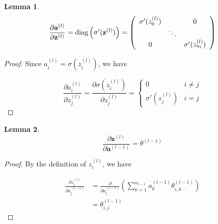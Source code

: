 \documentclass{article}[11pt]
\newtheorem{lemma}{Lemma}
\begin{document}
        
        \begin{lemma}
            
            $$
            \frac{\partial \mathbf{a}^{(l)}}{\partial \mathbf{z}^{(l)}} = \textnormal{diag} \left( \sigma'(\mathbf{z}^{(l)}) \right) = \left( \begin{array}{ccc}
            \sigma'(z^{(l)}_0) & & 0 \\
            & \ddots &  \\
            0 & & \sigma'(z^{(l)}_{n_l}) \\
            \end{array} \right)
            $$
            
        \end{lemma}
    
        \begin{proof}
        
            Since $a^{(l)}_i = \sigma(z^{(l)}_i)$, we have
            
            $$
            \frac{\partial a^{(l)}_i}{\partial z^{(l)}_j} = \frac{\partial \sigma(z^{(l)}_i)}{\partial z^{(l)}_j} = \begin{cases}
                0 & i \neq j \\
                \sigma'(z^{(l)}_j) & i = j
            \end{cases}
            $$
        
        \end{proof}
        
        
        
        \begin{lemma}
            
            $$
            \frac{\partial \mathbf{z}^{(l)}}{\partial \mathbf{a}^{(l-1)}} = \theta^{(l-1)}
            $$
            
        \end{lemma}
        
        \begin{proof}
            
            By the definition of $z^{(l)}_i$, we have
            
            $$ \begin{aligned}
            \frac{\partial z^{(l)}_i}{\partial a^{(l-1)}_j}
            &= \frac{\partial}{\partial a^{(l-1)}_j} \left( \sum_{k = 1}^{n_{l-1}} a^{(l-1)}_k \theta^{(l-1)}_{i,k} \right) \\
            &= \theta^{(l-1)}_{i,j}
            \end{aligned} $$
            
        \end{proof}
        
\end{document}

